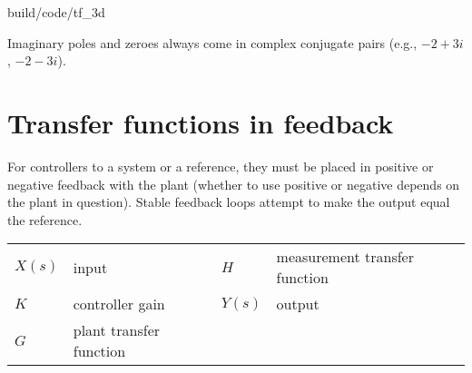 \begin{svg}{build/code/tf_3d}
  \caption{Equation \ref{eq:transfer_func} plotted in 3D}
  \label{fig:tf_3d}
\end{svg}

\begin{remark}
  Imaginary poles and zeroes always come in complex conjugate pairs (e.g.,
  $-2 + 3i$, $-2 - 3i$).
\end{remark}

\section{Transfer functions in feedback}

For \glspl{controller} to  a system or
 a reference, they must be placed in positive or
negative feedback with the \gls{plant} (whether to use positive or negative
depends on the \gls{plant} in question). Stable feedback loops attempt to make
the \gls{output} equal the \gls{reference}.

\begin{bookfigure}

  \caption{Feedback controller block diagram}
  \label{fig:feedback_controller_block_diagram}

  \begin{figurekey}
    \begin{tabulary}{\linewidth}{LLLL}
      $X(s)$ & input & $H$ & measurement transfer function \\
      $K$ & controller gain & $Y(s)$ & output \\
      $G$ & plant transfer function & & \\
    \end{tabulary}
  \end{figurekey}
\end{bookfigure}

